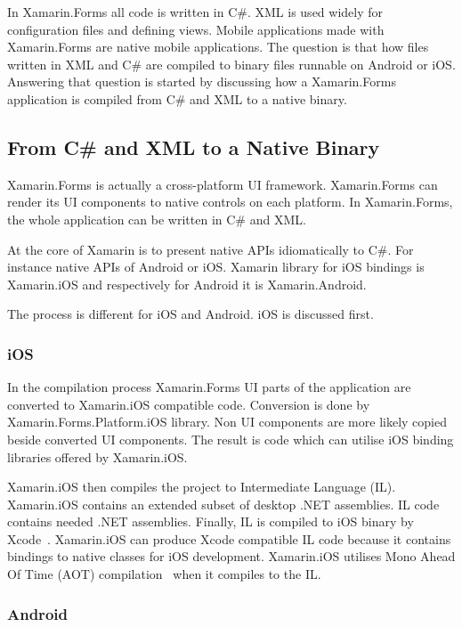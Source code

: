\documentclass[conference]{IEEEtran}
\begin{document}
In Xamarin.Forms all code is written in C\#. XML is used widely for configuration files and defining views. Mobile applications made with Xamarin.Forms are native mobile applications. The question is that how files written in XML and C\# are compiled to binary files runnable on Android or iOS. Answering that question is started by discussing how a Xamarin.Forms application is compiled from C\# and XML to a native binary.

\subsection{From C\# and XML to a Native Binary}

Xamarin.Forms is actually a cross-platform UI framework. Xamarin.Forms can render its UI components to native controls on each platform. In Xamarin.Forms, the whole application can be written in C\# and XML.

At the core of Xamarin is to present native APIs idiomatically to C\#. For instance native APIs of Android or iOS. Xamarin library for iOS bindings is Xamarin.iOS and respectively for Android it is Xamarin.Android.

The process is different for iOS and Android. iOS is discussed first.

\subsubsection{iOS}

In the compilation process Xamarin.Forms UI parts of the application are converted to Xamarin.iOS compatible code. Conversion is done by Xamarin.Forms.Platform.iOS library. Non UI components are more likely copied beside converted UI components. The result is code which can utilise iOS binding libraries offered by Xamarin.iOS.

Xamarin.iOS then compiles the project to Intermediate Language (IL). Xamarin.iOS contains an extended subset of desktop .NET assemblies. IL code contains needed .NET assemblies. Finally, IL is compiled to iOS binary by Xcode~\cite{xcode}. Xamarin.iOS can produce Xcode compatible IL code because it contains bindings to native classes for iOS development. Xamarin.iOS utilises Mono Ahead Of Time (AOT) compilation~\cite{mono_aot} when it compiles to the IL.

\subsubsection{Android}
\end{document}

